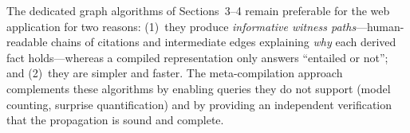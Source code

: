 \documentclass[10pt]{article}
\theoremstyle{plain}
\theoremstyle{definition}
\theoremstyle{remark}
\begin{document}
The dedicated graph algorithms of Sections~3--4 remain preferable for the web application for two reasons: (1)~they produce \emph{informative witness paths}---human-readable chains of citations and intermediate edges explaining \emph{why} each derived fact holds---whereas a compiled representation only answers ``entailed or not''; and (2)~they are simpler and faster. The meta-compilation approach complements these algorithms by enabling queries they do not support (model counting, surprise quantification) and by providing an independent verification that the propagation is sound and complete.

\clearpage


\end{document}

